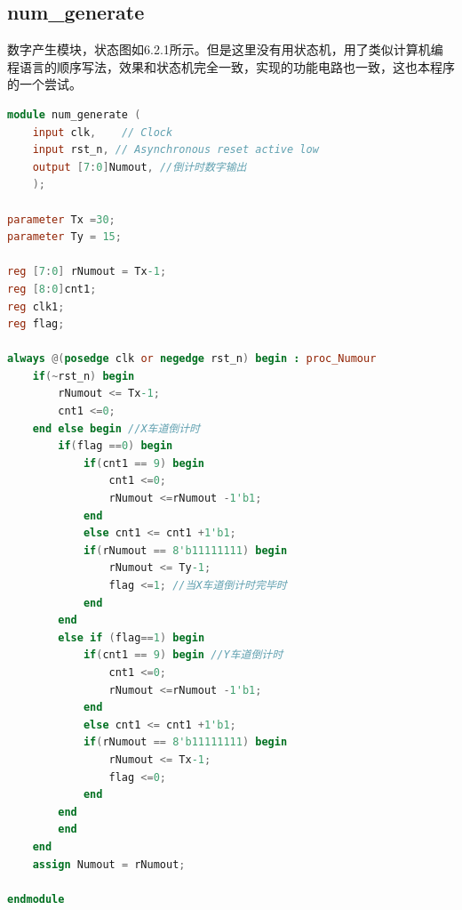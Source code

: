 \documentclass[12pt,a4paper]{article}
\begin{document}
	\subsection{num\_generate}
	数字产生模块，状态图如6.2.1所示。但是这里没有用状态机，用了类似计算机编程语言的顺序写法，效果和状态机完全一致，实现的功能电路也一致，这也本程序的一个尝试。
	\begin{lstlisting}[language=Verilog]
module num_generate (
	input clk,    // Clock
	input rst_n, // Asynchronous reset active low
	output [7:0]Numout, //倒计时数字输出
	);

parameter Tx =30;
parameter Ty = 15;

reg [7:0] rNumout = Tx-1;
reg [8:0]cnt1;
reg clk1;
reg flag;

always @(posedge clk or negedge rst_n) begin : proc_Numour
	if(~rst_n) begin
		rNumout <= Tx-1;
		cnt1 <=0;
	end else begin //X车道倒计时
		if(flag ==0) begin
			if(cnt1 == 9) begin
				cnt1 <=0;
				rNumout <=rNumout -1'b1;
			end
			else cnt1 <= cnt1 +1'b1;
			if(rNumout == 8'b11111111) begin
				rNumout <= Ty-1;
				flag <=1; //当X车道倒计时完毕时
			end
		end
		else if (flag==1) begin 
			if(cnt1 == 9) begin //Y车道倒计时
				cnt1 <=0;
				rNumout <=rNumout -1'b1;
			end
			else cnt1 <= cnt1 +1'b1;
			if(rNumout == 8'b11111111) begin
				rNumout <= Tx-1;
				flag <=0;
			end
		end
		end
	end
	assign Numout = rNumout;

endmodule

	\end{lstlisting}
\end{document}
